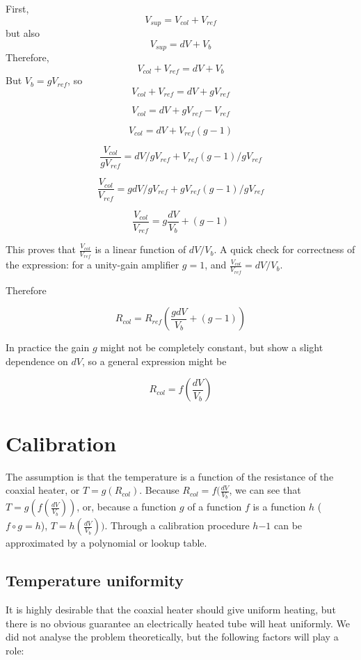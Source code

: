 First, 
\[ V_{sup} = V_{col} + V_{ref} \] 
but also
\[ V_{sup} = dV + V_b \]
Therefore,
\[ V_{col} + V_{ref} = dV + V_b \]
But \(V_{b} = g V_{ref}\), so
\[ V_{col} + V_{ref} = dV + gV_{ref} \]

\[ V_{col} = dV + gV_{ref} - V_{ref} \]

\[ V_{col} = dV + V_{ref}(g - 1) \]

\[ \frac{\displaystyle V_{col}}{\displaystyle gV_{ref}} = dV/gV_{ref} + V_{ref}(g-1)/gV_{ref} \]

\[\frac{\displaystyle V_{col}}{\displaystyle V_{ref}} = gdV/gV_{ref} + gV_{ref}(g-1)/gV_{ref} \]

\[\frac{\displaystyle V_{col}}{\displaystyle V_{ref}} = g\frac{dV}{V_b} + (g-1) \]

This proves that \( \frac{\displaystyle V_{col}}{\displaystyle V_{ref}} \) is a
linear function of $dV/V_b$. A quick check for correctness of the expression:
for a unity-gain amplifier $g = 1$, and $\frac{\displaystyle
V_{col}}{\displaystyle V_{ref}} = dV/V_b$.

Therefore 

\[ R_{col} = R_{ref} \left(\frac{g{dV}}{V_b} + (g-1) \right) \]

In practice the gain \(g\) might not be completely constant, but show a slight
dependence on \(dV\), so a general expression might be

\[ R_{col} = f\left(\frac{dV}{V_b} \right) \]


\section{Calibration}

The assumption is that the temperature is a function of the resistance of the
coaxial heater, or \( T = g(R_{col}) \). Because \( R_{col}=f(\frac{dV}{V_b} \),
we can see that \( T = g(f(\frac{dV}{V_b})) \), or, because a function \(g\) of
a function \(f\) is a function \(h\) (\(f \circ g = h \)), \( T =
h(\frac{dV}{V_b})) \).  Through a calibration procedure \(h{-1}\) can be
approximated by a polynomial or lookup table.

\subsection{Temperature uniformity}
\label{sec:Uniformity}

It is highly desirable that the coaxial heater should give uniform heating, but
there is no obvious guarantee an electrically heated tube will heat uniformly.
We did not analyse the problem theoretically, but the following factors will
play a role:

